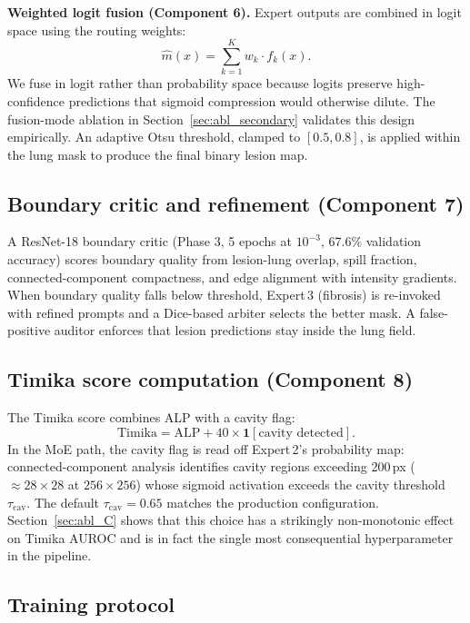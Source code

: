 \documentclass{article}
\begin{document}
\textbf{Weighted logit fusion (Component 6).} Expert outputs are combined in logit space using the routing weights:
\begin{equation}
\hat{m}(x) = \sum_{k=1}^{K} w_k \cdot f_k(x).
\label{eq:fusion}
\end{equation}
We fuse in logit rather than probability space because logits preserve high-confidence predictions that sigmoid compression would otherwise dilute. The fusion-mode ablation in Section~\ref{sec:abl_secondary} validates this design empirically. An adaptive Otsu threshold, clamped to $[0.5, 0.8]$, is applied within the lung mask to produce the final binary lesion map.

\subsection{Boundary critic and refinement (Component 7)}

A ResNet-18 \cite{he2016resnet} boundary critic (Phase 3, 5 epochs at $10^{-3}$, 67.6\% validation accuracy) scores boundary quality from lesion-lung overlap, spill fraction, connected-component compactness, and edge alignment with intensity gradients. When boundary quality falls below threshold, Expert\,3 (fibrosis) is re-invoked with refined prompts and a Dice-based arbiter selects the better mask. A false-positive auditor enforces that lesion predictions stay inside the lung field.

\subsection{Timika score computation (Component 8)}

The Timika score combines ALP with a cavity flag:
\begin{equation}
\text{Timika} = \text{ALP} + 40 \times \mathbf{1}[\text{cavity detected}].
\label{eq:timika}
\end{equation}
In the MoE path, the cavity flag is read off Expert\,2's probability map: connected-component analysis identifies cavity regions exceeding 200\,px ($\approx 28{\times}28$ at $256{\times}256$) whose sigmoid activation exceeds the cavity threshold $\tau_{\text{cav}}$. The default $\tau_{\text{cav}} = 0.65$ matches the production configuration. Section~\ref{sec:abl_C} shows that this choice has a strikingly non-monotonic effect on Timika AUROC and is in fact the single most consequential hyperparameter in the pipeline.

\subsection{Training protocol}
\end{document}
